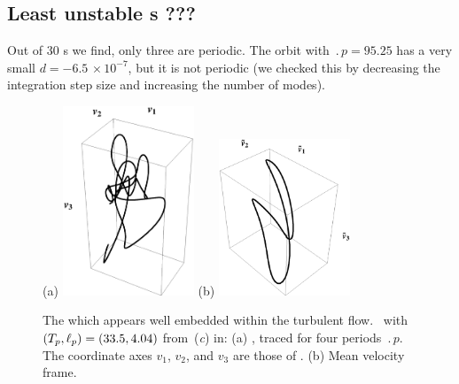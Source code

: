 %


\subsection*{Least unstable \rpo s ???}

%
Out of 30 \rpo s we
find,  only three are periodic.  The orbit
with $\period{p} = 95.25$ has a very small
$d = -6.5\,\times 10^{-7}$, but it is not periodic
(we
checked this by decreasing the integration step size and increasing the
number of modes).


\begin{figure}[t] \label{f:rpo55}
\begin{center}
(a) \includegraphics[width=0.35\textwidth]{figs/ks22rpo033.50_04.045E2.eps}
(b) \includegraphics[width=0.35\textwidth]{figs/ks22rpo033.50_04.045E2CM.eps}
\\
\end{center}
\caption{
 The
which appears well embedded within the turbulent flow.
\rpo\ with $({T_{p}},\ell_p) =(33.5,4.04)$
from \,(\textit{c}) in:
 (a) \Statesp, traced for four periods $\period{p}$. The coordinate axes
$v_1$, $v_2$, and $v_3$ are those of .
 (b) Mean velocity frame.
        }
\end{figure}



